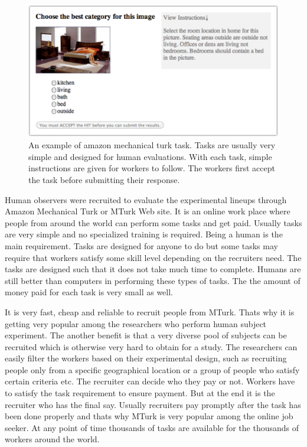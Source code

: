 \documentclass[11pt]{article}
\begin{document}
\begin{figure}[htbp] 
   \centering
   \includegraphics[width=5in]{amazon_task.pdf} 
   \caption{An example of amazon mechanical turk task. Tasks are usually very simple and designed for human evaluations. With each task, simple instructions are given for workers to follow. The workers first accept the task before submitting their response.}
   \label{fig:amazon_task}
\end{figure}


Human observers were recruited to evaluate the experimental lineups through Amazon Mechanical Turk \cite{turk} or MTurk Web site.  It is an online work place where people from around the world can perform some tasks and get paid. Usually tasks are very simple and no specialized training is required. Being a human is the main requirement. Tasks are designed for anyone to do but some tasks may require that workers satisfy some skill level depending on the recruiters need. The tasks are designed such that it does not take much time to complete. Humans are still better than computers in performing these types of tasks. The the amount of money paid for each task is very small as well. 

It is very fast, cheap and reliable to recruit people from MTurk. Thats why it is getting very popular among the researchers who perform human subject experiment. The another benefit is that a very diverse pool of subjects can be recruited which is otherwise very hard to obtain for a study. The researchers can easily filter the workers based on their experimental design, such as recruiting people only from a specific geographical location or a group of people who satisfy certain criteria etc. The recruiter can decide who they pay or not. Workers have to satisfy the task requirement to ensure payment. But at the end it is the recruiter who has the final say. Usually recruiters pay promptly after the task has been done properly and thats why MTurk is very popular among the online job seeker. At any point of time thousands of tasks are available for the thousands of workers around the world. 
\end{document}
